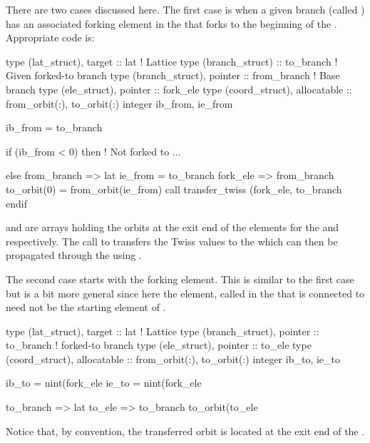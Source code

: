 {{{{{{{{There are two cases discussed here. The first case is when a given
branch (called ) has an associated forking element in
the  that forks to the beginning of the
. Appropriate code is:
\begin{example}
  type (lat_struct), target :: lat   ! Lattice 
  type (branch_struct) :: to_branch  ! Given forked-to branch
  type (branch_struct), pointer  :: from_branch ! Base branch
  type (ele_struct), pointer :: fork_ele
  type (coord_struct), allocatable :: from_orbit(:), to_orbit(:)
  integer ib_from, ie_from

  ib_from  = to_branch%

  if (ib_from < 0) then
    ! Not forked to ...

  else
    from_branch => lat%
    ie_from = to_branch%
    fork_ele => from_branch%
    to_orbit(0) = from_orbit(ie_from)
    call transfer_twiss (fork_ele, to_branch%
  endif
\end{example}
 and  are arrays holding the
orbits at the exit end of the elements for the  and
 respectively. The call to 
transfers the Twiss values to the  which can then be
propagated through the  using .

The second case starts with the  forking element.  This
is similar to the first case but is a bit more general since here the
element, called  in the  that is connected to
 need not be the starting element of .
\begin{example}
  type (lat_struct), target :: lat   ! Lattice 
  type (branch_struct), pointer :: to_branch  ! forked-to branch
  type (ele_struct), pointer :: to_ele
  type (coord_struct), allocatable :: from_orbit(:), to_orbit(:)
  integer ib_to, ie_to

  ib_to  = nint(fork_ele%
  ie_to  = nint(fork_ele%

  to_branch => lat%
  to_ele => to_branch%
  to_orbit(to_ele%
\end{example}  
Notice that, by convention, the transferred orbit is located at the
exit end of the .

}}}}}}}}
